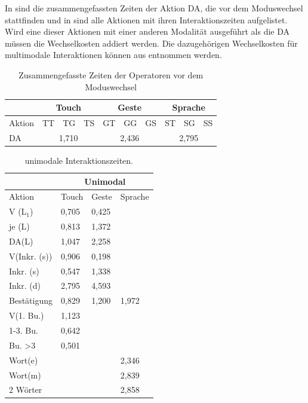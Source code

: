 In  sind die zusammengefassten Zeiten der Aktion DA, die vor dem Moduswechsel stattfinden und in  sind alle Aktionen mit ihren Interaktionszeiten aufgelistet. Wird eine dieser Aktionen mit einer anderen Modalität ausgeführt als die DA müssen die Wechselkosten addiert werden.
Die dazugehörigen Wechselkosten für multimodale Interaktionen können aus  entnommen werden.
\begin{table}[ht]
  \centering
	\begin{tabular}{|l|l|l|l|l|l|l|l|l|l|}
		\hline
		& \multicolumn{3}{|c|}{Touch} & \multicolumn{3}{|c|}{Geste}&\multicolumn{3}{|c|}{Sprache}\\
		\hline
		Aktion 					& TT 		& TG 		& TS 		& GT 		& GG 		& GS 		& ST 		& SG 		& SS\\
		\hline
		DA 	& \multicolumn{3}{|c|}{1,710} &	\multicolumn{3}{|c|}{2,436} 	&	\multicolumn{3}{|c|}{2,795} \\
		\hline			
  \end{tabular}
	\caption{Zusammengefasste Zeiten der Operatoren vor dem Moduswechsel}
\label{tab:DA}
\end{table}
\begin{table}[ht]
  \centering
			\begin{tabular}{|l|l|l|l|}
					\hline
				& \multicolumn{3}{|c|}{Unimodal}\\
				\hline
				Aktion 					& Touch & Geste & Sprache \\
				\hline
				V (L$_1$) 		& {0,705} 	&	{0,425}	&	\\
				\hline
				je (L)				& {0,813} &	{1,372} &\\
				\hline
				DA(L)						& {1,047} &	{2,258} & \\
				\hline
				V(Inkr. (s))		& {0,906} &	{0,198} &\\
				\hline
				Inkr. (s)			& {0,547} &	{1,338} &\\
				\hline
				Inkr. (d)					& {2,795} &	4,593 & \\		
				\hline		
				Bestätigung 		& {0,829} &{1,200} & {1,972}\\			
				\hline
				V(1. Bu.)					& {1,123} 	& 	&\\
				\hline	
				1-3. Bu.					& {0,642} & 	& \\
				\hline		
				Bu. >3 					& {0,501}		&  	& \\
				\hline	
				Wort(e)					& & & {2,346} \\
				\hline		
				Wort(m) 				& & & {2,839}\\
				\hline
				2 Wörter 				& & & {2,858}\\
				\hline
			\end{tabular}
	\caption{unimodale Interaktionszeiten.}
	\label{tab:AktionenUnimodal}
\end{table}
